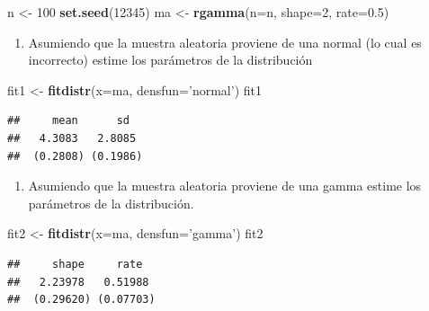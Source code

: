 \documentclass[10pt,]{krantz}
\makeatletter
\newenvironment{Shaded}{\begin{snugshade}}{\end{snugshade}}
\newcommand{\KeywordTok}[1]{\textcolor[rgb]{0.13,0.29,0.53}{\textbf{{#1}}}}
\newcommand{\DataTypeTok}[1]{\textcolor[rgb]{0.13,0.29,0.53}{{#1}}}
\newcommand{\DecValTok}[1]{\textcolor[rgb]{0.00,0.00,0.81}{{#1}}}
\newcommand{\FloatTok}[1]{\textcolor[rgb]{0.00,0.00,0.81}{{#1}}}
\newcommand{\StringTok}[1]{\textcolor[rgb]{0.31,0.60,0.02}{{#1}}}
\newcommand{\NormalTok}[1]{{#1}}
\providecommand{\tightlist}{%
  \setlength{\itemsep}{0pt}\setlength{\parskip}{0pt}}
\newenvironment{kframe}{%
\medskip{}
\setlength{\fboxsep}{.8em}
 \def\at@end@of@kframe{}%
 \ifinner\ifhmode%
  \def\at@end@of@kframe{\end{minipage}}%
  \begin{minipage}{\columnwidth}%
 \fi\fi%
 \def\FrameCommand##1{\hskip\@totalleftmargin \hskip-\fboxsep
 \colorbox{shadecolor}{##1}\hskip-\fboxsep
     \hskip-\linewidth \hskip-\@totalleftmargin \hskip\columnwidth}%
 \MakeFramed {\advance\hsize-\width
   \@totalleftmargin\z@ \linewidth\hsize
   \@setminipage}}%
 {\par\unskip\endMakeFramed%
 \at@end@of@kframe}
\renewenvironment{Shaded}{\begin{kframe}}{\end{kframe}}
\makeatother
\begin{document}
\begin{Shaded}
\begin{Highlighting}[]
\NormalTok{n <-}\StringTok{ }\DecValTok{100}
\KeywordTok{set.seed}\NormalTok{(}\DecValTok{12345}\NormalTok{)}
\NormalTok{ma <-}\StringTok{ }\KeywordTok{rgamma}\NormalTok{(}\DataTypeTok{n=}\NormalTok{n, }\DataTypeTok{shape=}\DecValTok{2}\NormalTok{, }\DataTypeTok{rate=}\FloatTok{0.5}\NormalTok{)}
\end{Highlighting}
\end{Shaded}

\begin{enumerate}
\def\labelenumi{\arabic{enumi})}
\tightlist
\item
  Asumiendo que la muestra aleatoria proviene de una normal (lo cual es
  incorrecto) estime los parámetros de la distribución
\end{enumerate}

\begin{Shaded}
\begin{Highlighting}[]
\NormalTok{fit1 <-}\StringTok{ }\KeywordTok{fitdistr}\NormalTok{(}\DataTypeTok{x=}\NormalTok{ma, }\DataTypeTok{densfun=}\StringTok{'normal'}\NormalTok{)}
\NormalTok{fit1}
\end{Highlighting}
\end{Shaded}

\begin{verbatim}
##     mean      sd  
##   4.3083   2.8085 
##  (0.2808) (0.1986)
\end{verbatim}

\begin{enumerate}
\def\labelenumi{\arabic{enumi})}
\setcounter{enumi}{1}
\tightlist
\item
  Asumiendo que la muestra aleatoria proviene de una gamma estime los
  parámetros de la distribución.
\end{enumerate}

\begin{Shaded}
\begin{Highlighting}[]
\NormalTok{fit2 <-}\StringTok{ }\KeywordTok{fitdistr}\NormalTok{(}\DataTypeTok{x=}\NormalTok{ma, }\DataTypeTok{densfun=}\StringTok{'gamma'}\NormalTok{)}
\NormalTok{fit2}
\end{Highlighting}
\end{Shaded}

\begin{verbatim}
##     shape     rate  
##   2.23978   0.51988 
##  (0.29620) (0.07703)
\end{verbatim}
\end{document}
